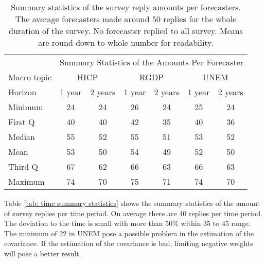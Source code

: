 \documentclass[11pt]{article}
\begin{document}
\begin{table}[!h]
	\centering
	\caption{Summary statistics of the survey reply amounts per forecasters. The average forecasters made around 50 replies for the whole duration of the survey. No forecaster replied to all survey. Means are round down to whole number for readability.}
	\label{tab: forecaster summary statistics}
	\begin{tabular}{lcccccc}%
		\hline
		&\multicolumn{6}{c}{Summary Statistics of the Amounts Per Forecaster}\\
		\cmidrule(lr){2-7}
		Macro topic & \multicolumn{2}{c}{HICP} & \multicolumn{2}{c}{RGDP} & \multicolumn{2}{c}{UNEM} \\
		\cmidrule(lr){2-3} \cmidrule(lr){4-5}\cmidrule(lr){6-7}
		Horizon     & 1 year & 2 years & 1 year & 2 years & 1 year & 2 years \\ 
		\hline
		Minimum & 24    & 24    & 26    & 24    & 25    & 24    \\
		First Q & 40    & 40    & 42    & 35    & 40    & 36    \\
		Median  & 55    & 52    & 55    & 51    & 53    & 52    \\
		Mean    & 53    & 50    & 54    & 49    & 52    & 50    \\
		Third Q & 67    & 62    & 66    & 63    & 66    & 63    \\
		Maximum & 74    & 70    & 75    & 71    & 74    & 70      \\ 
		\hline
	\end{tabular}
\end{table}

Table \ref{tab: time summary statistics} shows the summary statistics of the amount of survey replies per time period. On average there are 40 replies per time period. The deviation to the time is small with more than 50\% within 35 to 45 range. The minimum of 22 in UNEM pose a possible problem in the estimation of the covariance. If the estimation of the covariance is bad, limiting negative weights will pose a better result.
\end{document}
